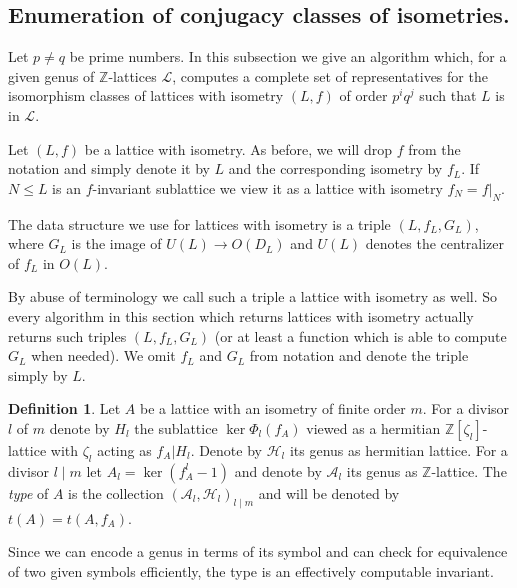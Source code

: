 \documentclass[a4paper]{amsart}
\theoremstyle{definition}
\newtheorem{definition}{Definition}[section]
\theoremstyle{plain}
\newcommand{\ZZ}{\mathbb{Z}}
\renewcommand{\H}{\mathcal{H}}
\newcommand{\A}{\mathcal{A}}
\renewcommand{\L}{\mathcal{L}}
\newcommand{\disc}[1]{{D_{#1}}}
\begin{document}
\subsection{Enumeration of conjugacy classes of isometries.}\label{enumconj}
Let $p\neq q$ be prime numbers.
In this subsection we give an algorithm which, for a given genus of $\ZZ$-lattices $\L$, computes a complete set of representatives for the isomorphism classes of lattices with isometry $(L,f)$ of order $p^i q^j$ such that $L$ is in $\L$.

Let $(L,f)$ be a lattice with isometry. As before, we will drop $f$ from the notation and simply denote it by $L$ and the corresponding isometry by $f_L$.
If $N \leq L$ is an $f$-invariant sublattice we view it as a lattice with isometry $f_N = f|_N$.

The data structure we use for lattices with isometry is a triple
$(L,f_L,G_L)$, where $G_L$ is the image of $U(L) \to O(\disc{L})$ and $U(L)$ denotes the centralizer of $f_L$ in $O(L)$.

By abuse of terminology we call such a triple a lattice with isometry as well.
So every algorithm in this section which returns lattices with isometry actually returns such triples $(L,f_L,G_L)$ (or at least a function which is able to compute $G_L$ when needed). We omit $f_L$ and $G_L$ from notation and denote the triple simply by $L$.

\begin{definition}
 Let $A$ be a lattice with an isometry of finite order $m$.
 For a divisor $l$ of $m$ denote by $H_l$ the sublattice $\ker \Phi_{l}(f_A)$ viewed as a hermitian $\ZZ[\zeta_l]$-lattice with $\zeta_l$ acting as $f_A|H_l$. Denote by $\H_l$ its genus as hermitian lattice.
 For a divisor $l \mid m$ let $A_l = \ker (f_A^l-1)$ and denote by $\A_l$ its genus as $\ZZ$-lattice. The \emph{type} of $A$ is the collection $(\A_l,\H_l)_{l \mid m}$ and will be denoted by $t(A) = t(A, f_A)$.
\end{definition}

Since we can encode a genus in terms of its symbol and can check for equivalence of two given symbols efficiently, the type is an effectively computable invariant.
\end{document}
